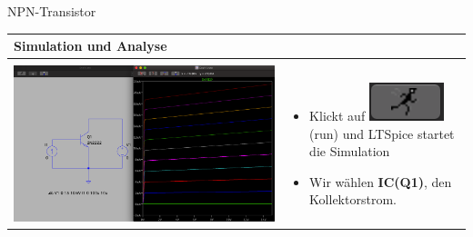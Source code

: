    \begin{frame}[t]{NPN-Transistor}
  
    \begin{spacing}{0.9} \begin{tiny}
    \begin{table}[h!]
      \begin{tabular}{p{5cm} p{5cm}}
        \hline
        \textbf{Simulation und Analyse} & \\
        \hline \\
        \begin{minipage}{.5\textwidth}
          \includegraphics[width=\linewidth]{pictures/analysis_3.png}
        \end{minipage} 
        & 
        \begin{minipage}{.5\textwidth}
        \begin{itemize}
          \item Klickt auf \includegraphics[scale=0.3]{pictures/run.png} (run) und LTSpice startet die Simulation
        \item Wir wählen \textbf{IC(Q1)}, den Kollektorstrom.
        \end{itemize}
        \end{minipage} 
        \\
      \end{tabular}
    \end{table}
  \end{tiny} \end{spacing}
  

\end{frame}
